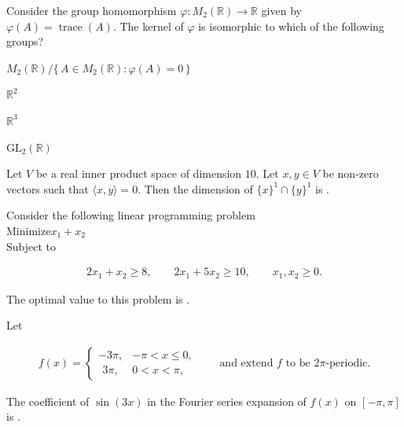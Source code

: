 \documentclass[journal,12pt,onecolumn]{IEEEtran}
\theoremstyle{remark}
\begin{document}
\begin{enumerate}
{\hfill{}

\item Consider the group homomorphism \(\varphi:M_{2}(\mathbb{R})\to\mathbb{R}\) given by
\(\varphi(A)=\operatorname{trace}(A)\). The kernel of \(\varphi\) is isomorphic to which of the
following groups?

\begin{enumerate}
\begin{multicols}{2}
\item \( M_{2}(\mathbb{R}) \big/ \{\,A\in M_{2}(\mathbb{R}) : \varphi(A)=0\,\} \)
\item \( \mathbb{R}^{2} \)
\item \( \mathbb{R}^{3} \)
\item \( \mathrm{GL}_{2}(\mathbb{R}) \)
\end{multicols}
\end{enumerate}

\item Let $V$ be a real inner product space of dimension $10$.
Let $x,y\in V$ be non-zero vectors such that $\langle x,y\rangle=0$.
Then the dimension of $\{x\}^{1}\cap\{y\}^{1}$ is \underline{\hspace{3cm}}.

\hfill{}

\item Consider the following linear programming problem\\
Minimize\quad $x_1+x_2$\\
Subject to

\begin{align*}
2x_1+x_2\ge 8,\qquad 2x_1+5x_2\ge 10,\qquad x_1,x_2\ge 0.
\end{align*}

The optimal value to this problem is \underline{\hspace{3.2cm}}.

\hfill{}

\item Let

\begin{align*}
f(x)=
\begin{cases}
-3\pi, & -\pi<x\le 0,\\[2pt]
\ \,3\pi, & 0<x<\pi,
\end{cases}
\qquad\text{and extend $f$ to be $2\pi$-periodic.}
\end{align*}

The coefficient of $\sin(3x)$ in the Fourier series expansion of $f(x)$ on
$[-\pi,\pi]$ is \underline{\hspace{3.0cm}}.

}
\end{enumerate}
\end{document}
